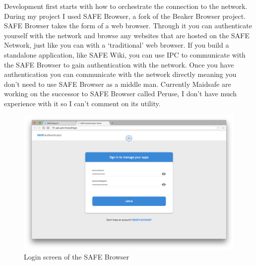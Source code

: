 Development first starts with how to orchestrate the connection to the network. During my project I used SAFE Browser, a fork of the Beaker Browser project. SAFE Browser takes the form of a web browser. Through it you can authenticate yourself with the network and browse any websites that are hosted on the SAFE Network, just like you can with a `traditional' web browser. If you build a standalone application, like SAFE Wiki, you can use IPC to communicate with the SAFE Browser to gain authentication with the network. Once you have authentication you can communicate with the network directly meaning you don't need to use SAFE Browser as a middle man. Currently Maidsafe are working on the successor to SAFE Browser called Peruse, I don't have much experience with it so I can't comment on its utility. 

\begin{figure}[h]
	\begin{center}
		\includegraphics[width=\textwidth]{images/safe-browser-login}
		\caption{Login screen of the SAFE Browser}
		\label{fig:safe-browser-login}
	\end{center}
\end{figure}

